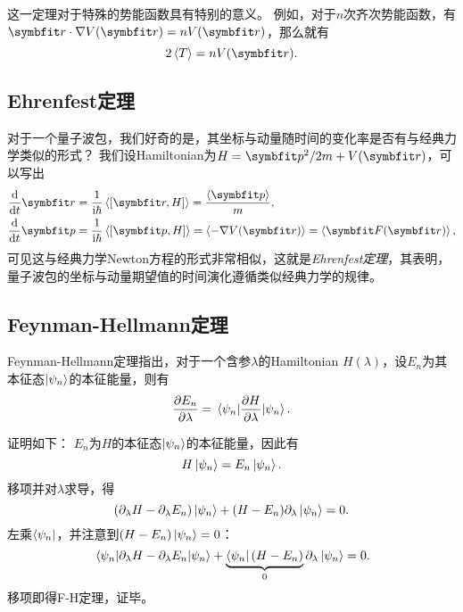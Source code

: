 这一定理对于特殊的势能函数具有特别的意义。
例如，对于$n$次齐次势能函数，有$\rr\cdot\nabla V(\rr) = nV(\rr)$，那么就有
\begin{equation}
    2\expval{T} = nV(\rr).
\end{equation}


\subsection{Ehrenfest定理}

对于一个量子波包，我们好奇的是，其坐标与动量随时间的变化率是否有与经典力学类似的形式？
我们设Hamiltonian为$H=\pp^2/2m + V(\rr)$，可以写出
\begin{equation}
\begin{aligned}
    \frac{\dd}{\dd t}\rr &= \frac{1}{\ii\hbar} \expval{[\rr, H]} = \frac{\expval{\pp}}{m}, \\
    \frac{\dd}{\dd t}\pp &= \frac{1}{\ii\hbar} \expval{[\pp, H]} = \expval{-\nabla V(\rr)} = \expval{\bm{F}(\rr)},
\end{aligned}
\end{equation}
可见这与经典力学Newton方程的形式非常相似，这就是\emph{Ehrenfest定理}，其表明，量子波包的坐标与动量期望值的时间演化遵循类似经典力学的规律。


\subsection{Feynman-Hellmann定理}

Feynman-Hellmann定理指出，对于一个含参$\lambda$的Hamiltonian $H(\lambda)$，设$E_n$为其本征态$\ket{\psi_n}$的本征能量，则有
\begin{equation}
    \frac{\partial E_n}{\partial \lambda} = \mel{\psi_n}{\frac{\partial H}{\partial\lambda}}{\psi_n}.
\end{equation}

证明如下：
$E_n$为$H$的本征态$\ket{\psi_n}$的本征能量，因此有
\begin{equation}
    H\ket{\psi_n} = E_n \ket{\psi_n}.
\end{equation}
移项并对$\lambda$求导，得
\begin{equation}
    \left( \partial_\lambda H - \partial_\lambda E_n \right) \ket{\psi_n} + (H-E_n) \partial_\lambda \ket{\psi_n} = 0.
\end{equation}
左乘$\bra{\psi_n}$，并注意到$(H-E_n)\ket{\psi_n}=0$：
\begin{equation}
    \mel{\psi_n}{\partial_\lambda H - \partial_\lambda E_n}{\psi_n} + \underbrace{\bra{\psi_n} (H-E_n)}_{0} \partial_\lambda \ket{\psi_n} = 0.
\end{equation}
移项即得F-H定理，证毕。
